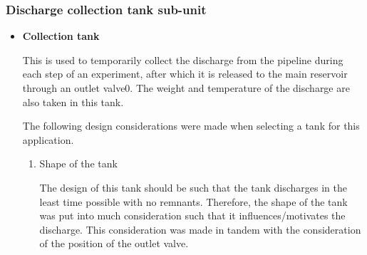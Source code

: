\subsubsection{Discharge collection tank sub-unit}
\begin{itemize}
\item \textbf{Collection tank}
\par
This is used to temporarily collect the discharge from the pipeline during each step of an experiment, after which it is released to the main reservoir through an outlet valve0. The weight and temperature of the discharge are also taken in this tank. 
\par
The following design considerations were made when selecting a tank for this application.
\begin{enumerate}
    \item Shape of the tank 
    \par
    The design of this tank should be such that the tank discharges in the least time possible with no remnants. Therefore, the shape of the tank was put into much consideration such that it influences/motivates the discharge. This consideration was made in tandem with the consideration of the position of the outlet valve.
    

\end{enumerate}
\end{itemize}
